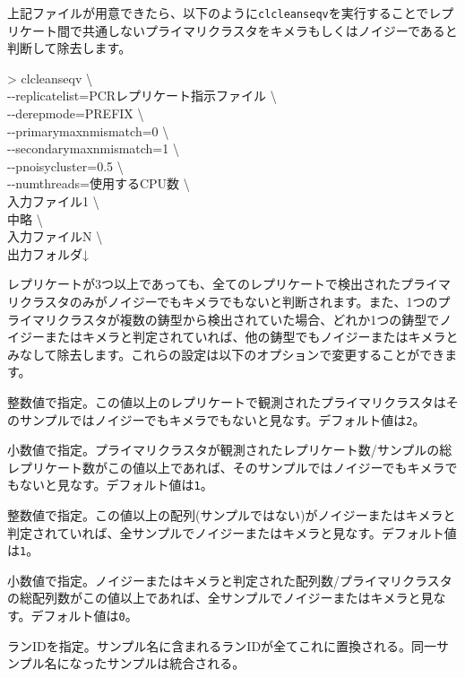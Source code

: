\documentclass[titlepage,10pt,a4paper]{jsbook}
\newenvironment{cmd}{\begin{oframed}\raggedright\ttfamily\footnotesize\setlength{\baselineskip}{1.4em}}{\end{oframed}\vspace{-1em}}
\begin{document}
上記ファイルが用意できたら、以下のように\texttt{clcleanseqv}を実行することでレプリケート間で共通しないプライマリクラスタをキメラもしくはノイジーであると判断して除去します。
\begin{cmd}
{\textgreater} clcleanseqv {\textbackslash}\\
{-}{-}replicatelist=PCRレプリケート指示ファイル {\textbackslash}\\
{-}{-}derepmode=PREFIX {\textbackslash}\\
{-}{-}primarymaxnmismatch=0 {\textbackslash}\\
{-}{-}secondarymaxnmismatch=1 {\textbackslash}\\
{-}{-}pnoisycluster=0.5 {\textbackslash}\\
{-}{-}numthreads=使用するCPU数 {\textbackslash}\\
入力ファイル1 {\textbackslash}\\
中略 {\textbackslash}\\
入力ファイルN {\textbackslash}\\
出力フォルダ↓
\end{cmd}
レプリケートが3つ以上であっても、全てのレプリケートで検出されたプライマリクラスタのみがノイジーでもキメラでもないと判断されます。また、1つのプライマリクラスタが複数の鋳型から検出されていた場合、どれか1つの鋳型でノイジーまたはキメラと判定されていれば、他の鋳型でもノイジーまたはキメラとみなして除去します。これらの設定は以下のオプションで変更することができます。
\begin{description}\small\setlength{\baselineskip}{1.1em}
\item[\texttt{{-}{-}minnreplicate}] 整数値で指定。この値以上のレプリケートで観測されたプライマリクラスタはそのサンプルではノイジーでもキメラでもないと見なす。デフォルト値は\texttt{2}。
\item[\texttt{{-}{-}minpreplicate}] 小数値で指定。プライマリクラスタが観測されたレプリケート数/サンプルの総レプリケート数がこの値以上であれば、そのサンプルではノイジーでもキメラでもないと見なす。デフォルト値は\texttt{1}。
\item[\texttt{{-}{-}minnpositive}] 整数値で指定。この値以上の配列(サンプルではない)がノイジーまたはキメラと判定されていれば、全サンプルでノイジーまたはキメラと見なす。デフォルト値は\texttt{1}。
\item[\texttt{{-}{-}minppositive}] 小数値で指定。ノイジーまたはキメラと判定された配列数/プライマリクラスタの総配列数がこの値以上であれば、全サンプルでノイジーまたはキメラと見なす。デフォルト値は\texttt{0}。
\item[\texttt{{-}{-}runname}] ランIDを指定。サンプル名に含まれるランIDが全てこれに置換される。同一サンプル名になったサンプルは統合される。
\end{description}
\end{document}
